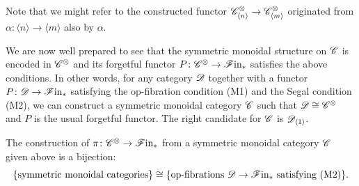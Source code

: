     Note that we might refer to the constructed functor $\mathscr{C}^{\otimes}_{\langle n
    \rangle} \to \mathscr{C}^{\otimes}_{\langle m \rangle}$ originated from $\alpha \colon
    \langle n \rangle \to \langle m \rangle$ also by $\alpha$.


We are now well prepared to see that the symmetric monoidal structure on $\mathscr{C}$ is
encoded in $\mathscr{C}^{\otimes}$ and its forgetful functor $P \colon \mathscr{C}^{\otimes} \to \mathscr{F} \text{in}_{\ast}$
satisfies the above conditions. In other words, for any category $\mathscr{D}$ together
with a functor $P \colon \mathscr{D} \to \mathscr{F} \text{in}_{\ast}$ satisfying the op-fibration condition (M1)
and the Segal condition (M2), we can construct a symmetric monoidal  category
$\mathscr{C}$ such that $\mathscr{D} \cong \mathscr{C}^{\otimes}$ and $P$ is the usual forgetful functor. The
right candidate for $\mathscr{C}$ is $\mathscr{D}_{\langle 1 \rangle}$.

 \begin{prop}\label{SymMonBijection} The construction of $\pi \colon \mathscr{C}^{\otimes}
    \to \mathscr{F} \text{in}_{\ast}$ from a symmetric monoidal category $\mathscr{C}$ given above is a
    bijection:
    \[
    \{\text{symmetric monoidal categories}\} \cong \{\text{op-fibrations } \mathscr{D} \to \mathscr{F} \text{in}_{\ast} \text{ satisfying (M2)}\}.
    \]
 \end{prop}

